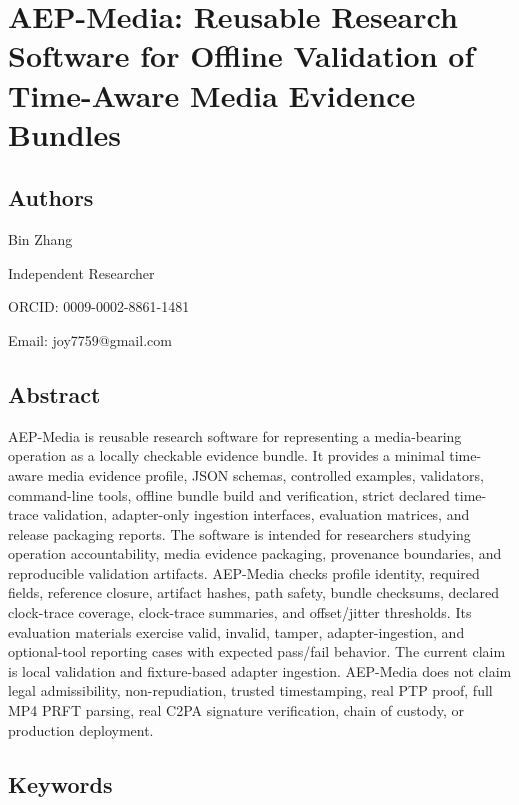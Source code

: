 \documentclass[
]{article}
\author{}
\date{}
\begin{document}
\section{AEP-Media: Reusable Research Software for Offline Validation of
Time-Aware Media Evidence
Bundles}\label{aep-media-reusable-research-software-for-offline-validation-of-time-aware-media-evidence-bundles}

\subsection{Authors}\label{authors}

Bin Zhang

Independent Researcher

ORCID: 0009-0002-8861-1481

Email: joy7759@gmail.com

\subsection{Abstract}\label{abstract}

AEP-Media is reusable research software for representing a media-bearing
operation as a locally checkable evidence bundle. It provides a minimal
time-aware media evidence profile, JSON schemas, controlled examples,
validators, command-line tools, offline bundle build and verification,
strict declared time-trace validation, adapter-only ingestion
interfaces, evaluation matrices, and release packaging reports. The
software is intended for researchers studying operation accountability,
media evidence packaging, provenance boundaries, and reproducible
validation artifacts. AEP-Media checks profile identity, required
fields, reference closure, artifact hashes, path safety, bundle
checksums, declared clock-trace coverage, clock-trace summaries, and
offset/jitter thresholds. Its evaluation materials exercise valid,
invalid, tamper, adapter-ingestion, and optional-tool reporting cases
with expected pass/fail behavior. The current claim is local validation
and fixture-based adapter ingestion. AEP-Media does not claim legal
admissibility, non-repudiation, trusted timestamping, real PTP proof,
full MP4 PRFT parsing, real C2PA signature verification, chain of
custody, or production deployment.

\subsection{Keywords}\label{keywords}
\end{document}
